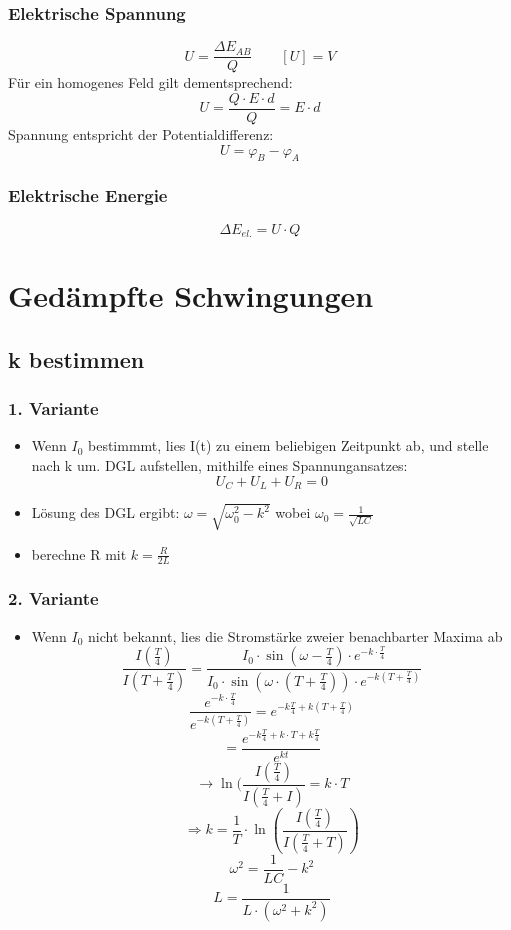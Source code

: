 \documentclass[12pt,a4paper,titlepage]{article}
\begin{document}
			\subsubsection{Elektrische Spannung}
				$$U = \frac{\Delta E_{AB}}{Q} \qquad [U] = V$$
				Für ein homogenes Feld gilt dementsprechend: \\
				$$U = \frac{Q \cdot E \cdot d}{Q} = E \cdot d$$
				Spannung entspricht der Potentialdifferenz: \\
				$$U = \varphi_B - \varphi_A$$
			\subsubsection{Elektrische Energie}
				$$\Delta E_{el.} = U \cdot Q$$
	\section{Gedämpfte Schwingungen}
		\subsection{k bestimmen}
			\subsubsection{1. Variante}
				\begin{itemize}
					\item Wenn $I_0$  bestimmmt, lies I(t) zu einem beliebigen Zeitpunkt ab, und stelle nach k um. 
					DGL aufstellen, mithilfe eines Spannungansatzes:
					 $$ U_{C}+U_{L}+U_{R}=0 $$
					\item Lösung des DGL ergibt:
					$ \omega= \sqrt{\omega_{0}^2-k^2} $ wobei $ \omega_0 = \frac{1}{\sqrt{LC}}$
					\item berechne R mit $ k = \frac{R}{2L} $
					\end{itemize}
			\subsubsection{2. Variante}
				\begin{itemize}
					\item Wenn $I_0$ nicht bekannt, lies die Stromstärke zweier benachbarter Maxima ab
					$$ \frac{I(\frac{T}{4})}{I (T+\frac{T}{4})} = \frac{I_0\cdot\sin({\omega-\frac{T}{4}})\cdot e^{-k\cdot\frac{T}{4}}}{I_0\cdot\sin(\omega \cdot ( T+\frac{T}{4}))\cdot e^{-k(T+\frac{T}{4})}} $$
					$$ \frac{e^{-k \cdot \frac{T}{4}}} {e^{-k(T+ \frac{T}{4})}} = e^{-k \frac{T}{4}+k(T+\frac{T}{4})} $$
					$$ = \frac{e^{-k\frac{T}{4}+k \cdot T+ k \frac{T}{4}}}{e^{kt}} $$
					$$ \rightarrow \ln (\frac{I (\frac{T}{4})}{I(\frac{T}{4}+I)} = k \cdot T $$
					\Large $$  \Rightarrow k= \frac{1}{T} \cdot \ln(\frac{I(\frac{T}{4})}{I(\frac{T}{4}+T)}) $$  
					\normalsize $$ \omega^2 = \frac{1}{LC} - k^2  $$
					\Large $$ L = \frac{1}{L\cdot (\omega^2+k^2)}$$
				\end{itemize}
\end{document}
